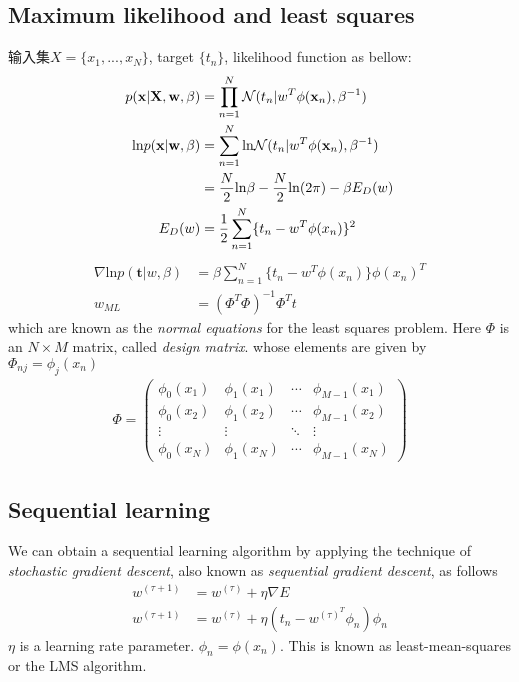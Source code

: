 \documentclass[a4paper]{article}
\begin{document}
\subsection{Maximum likelihood and least squares}
输入集$X = \{x_1,...,x_N\}$, target $\{t_n\}$, likelihood function as bellow:
\begin{align*}
  p(\mathbf{x}|\mathbf{X},\mathbf{w},\beta) &= \prod_{n=1}^N \mathcal{N}(t_n|w^T\phi(\mathbf{x}_n), \beta^{-1})\\
\mathrm{ln} p(\mathbf{x}|\mathbf{w},\beta) &= \sum_{n=1}^N \mathrm{ln} \mathcal{N}(t_n|w^T\phi(\mathbf{x}_n), \beta^{-1}) \\
& = {N \over 2} \mathrm{ln} \beta - {N \over 2} \mathrm{ln} (2\pi) - \beta E_D(w)\\
E_D(w) &= {1 \over 2} \sum_{n=1}^N \{t_n -w^T\phi(x_n)\}^2\\
\end{align*}
\begin{align*}
\nabla \mathrm{ln} p(\mathbf{t}|w,\beta) &= \beta \sum_{n=1}^N \{t_n -w^T\phi(x_n)\} \phi(x_n)^T\\
w_{ML} &= (\Phi^T\Phi)^{-1}\Phi^Tt
\end{align*}
which are known as the \textit{normal equations} for the least squares problem. Here $\Phi$ is an $N \times M$ matrix, called \textit{design matrix}. whose elements are given by $\Phi_{nj} = \phi_j(x_n)$
\begin{align}
  \Phi =
  \begin{pmatrix}
    \phi_0(x_1) & \phi_1(x_1) & \cdots & \phi_{M-1}(x_1)\\
    \phi_0(x_2) & \phi_1(x_2) & \cdots & \phi_{M-1}(x_2)\\
    \vdots & \vdots & \ddots & \vdots\\
    \phi_0(x_N) & \phi_1(x_N) & \cdots & \phi_{M-1}(x_N)
  \end{pmatrix}
\end{align}

\subsection{Sequential learning}
\label{sec:3.1.3}

We can obtain a sequential learning algorithm by applying the technique of \textit{stochastic gradient descent}, also known as \textit{sequential gradient descent}, as follows
\begin{align*}
  w^{(\tau+1)} &= w^{(\tau)} + \eta \nabla E\\
  w^{(\tau+1)} &= w^{(\tau)} + \eta (t_n - w^{(\tau)^T}\phi_n) \phi_n
\end{align*}
$\eta$ is a learning rate parameter. $\phi_n = \phi(x_n)$. This is known as least-mean-squares or the LMS algorithm.
\end{document}
